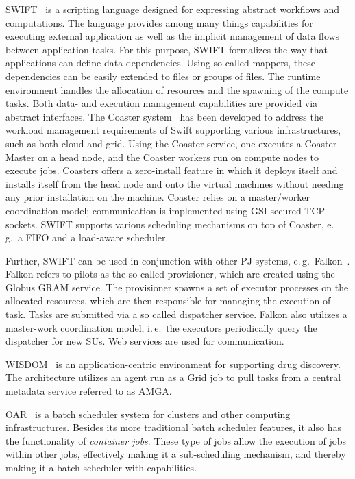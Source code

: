 \documentclass{sig-alternate}
\begin{document}
SWIFT~\cite{Wilde2011} is a scripting language designed for expressing
abstract workflows and computations. The language provides among many
things capabilities for executing external application as well as the
implicit management of data flows between application tasks. For this
purpose, SWIFT formalizes the way that applications can define
data-dependencies. Using so called mappers, these dependencies can be
easily extended to files or groups of files. The runtime environment
handles the allocation of resources and the spawning of the compute
tasks. Both data- and execution management capabilities are provided
via abstract interfaces. The Coaster system~\cite{coasters} has been
developed to address the workload management requirements of Swift
supporting various infrastructures, such as both cloud and grid. Using
the Coaster service, one executes a Coaster Master on a head node, and
the Coaster workers run on compute nodes to execute jobs.  Coasters
offers a zero-install feature in which it deploys itself and installs
itself from the head node and onto the virtual machines  without
needing any prior installation on the machine. Coaster relies on a
master/worker coordination model; communication is implemented using
GSI-secured TCP sockets. SWIFT supports various scheduling mechanisms
on top of Coaster, e.\,g.\ a FIFO and a load-aware scheduler.

Further, SWIFT can be used in conjunction with other PJ systems,
e.\,g.\ Falkon~\cite{1362680}. Falkon refers to pilots as the so
called provisioner, which are created using the Globus GRAM
service. The provisioner spawns a set of executor processes on the
allocated resources, which are then responsible for managing the
execution of task. Tasks are submitted via a so called dispatcher
service. Falkon also utilizes a master-work coordination model,
i.\,e.\ the executors periodically query the dispatcher for new
SUs.  Web services are used for communication.

WISDOM~\cite{Ahn:2008:ITR:1444448.1445115,wisdom} is an application-centric
environment for supporting drug discovery. The architecture utilizes an agent
run as a Grid job to pull tasks from a central metadata service referred to as
AMGA.

OAR~\cite{oar} is a batch scheduler system for clusters and other
computing infrastructures. Besides its more traditional batch scheduler
features, it also has the functionality of \textit{container jobs}. These type
of jobs allow the execution of jobs within other jobs, effectively making it a
sub-scheduling mechanism, and thereby making it a batch scheduler with
\pilotjob capabilities. 
\end{document}
